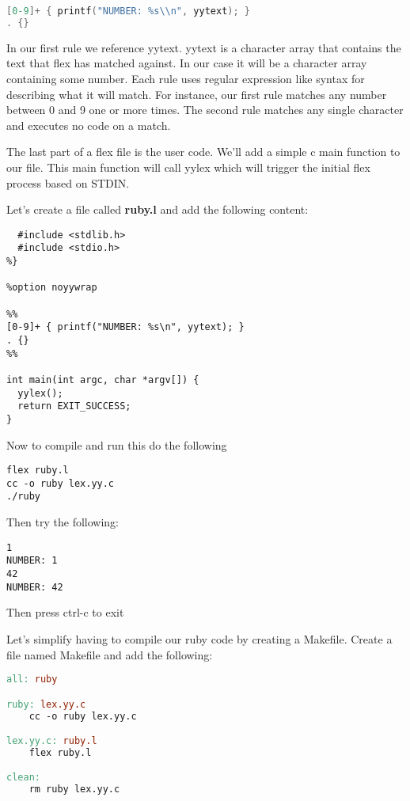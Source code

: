 \begin{lstlisting}[language=C]
[0-9]+ { printf("NUMBER: %s\\n", yytext); }
. {}
\end{lstlisting}

In our first rule we reference yytext. yytext is a character array that contains the text that flex has matched against. In our case it will be a character array containing some number. Each rule uses regular expression like syntax for describing what it will match. For instance, our first rule matches any number between 0 and 9 one or more times. The second rule matches any single character and executes no code on a match.

The last part of a flex file is the user code. We'll add a simple c main function to our file. This main function will call yylex which will trigger the initial flex process based on STDIN.

Let's create a file called {\bf ruby.l} and add the following content:

\begin{lstlisting}[language=Flex]
%{
  #include <stdlib.h>
  #include <stdio.h>
%}

%option noyywrap

%%
[0-9]+ { printf("NUMBER: %s\n", yytext); }
. {}
%%

int main(int argc, char *argv[]) {
  yylex();
  return EXIT_SUCCESS;
}
\end{lstlisting}

Now to compile and run this do the following

\begin{lstlisting}
flex ruby.l
cc -o ruby lex.yy.c
./ruby
\end{lstlisting}

Then try the following:

\begin{lstlisting}
1
NUMBER: 1
42
NUMBER: 42
\end{lstlisting}

Then press ctrl-c to exit

Let's simplify having to compile our ruby code by creating a Makefile. Create a file named Makefile and add the following:

\begin{lstlisting}[language=make]
all: ruby

ruby: lex.yy.c
	cc -o ruby lex.yy.c

lex.yy.c: ruby.l
	flex ruby.l

clean:
	rm ruby lex.yy.c
\end{lstlisting}

